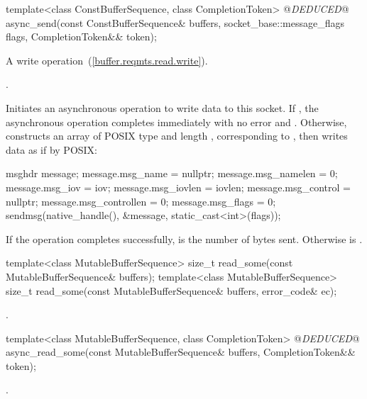 \begin{itemdecl}
template<class ConstBufferSequence, class CompletionToken>
  @\textit{DEDUCED}@ async_send(const ConstBufferSequence& buffers,
                     socket_base::message_flags flags,
                     CompletionToken&& token);
\end{itemdecl}

\begin{itemdescr}
\pnum
A write operation~(\ref{buffer.reqmts.read.write}).

\pnum
\completionsig {}.

\pnum
\effects Initiates an asynchronous operation to write data to this socket. If , the asynchronous operation completes immediately with no error and . Otherwise, constructs an array  of POSIX type  and length , corresponding to , then writes data as if by POSIX: 
\begin{codeblock}
msghdr message;
message.msg_name = nullptr;
message.msg_namelen = 0;
message.msg_iov = iov;
message.msg_iovlen = iovlen;
message.msg_control = nullptr;
message.msg_controllen = 0;
message.msg_flags = 0;
sendmsg(native_handle(), &message, static_cast<int>(flags));
\end{codeblock}


\pnum
If the operation completes successfully,  is the number of bytes sent. Otherwise  is .
\end{itemdescr}

\begin{itemdecl}
template<class MutableBufferSequence>
  size_t read_some(const MutableBufferSequence& buffers);
template<class MutableBufferSequence>
  size_t read_some(const MutableBufferSequence& buffers,
                   error_code& ec);
\end{itemdecl}

\begin{itemdescr}
\pnum
\returns {}.
\end{itemdescr}

\begin{itemdecl}
template<class MutableBufferSequence, class CompletionToken>
  @\textit{DEDUCED}@ async_read_some(const MutableBufferSequence& buffers,
                          CompletionToken&& token);
\end{itemdecl}

\begin{itemdescr}
\pnum
\returns {}.
\end{itemdescr}

